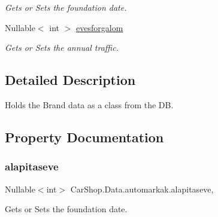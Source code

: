 \begin{DoxyCompactItemize}
\begin{DoxyCompactList}\small\item\em Gets or Sets the foundation date. \end{DoxyCompactList}\item 
Nullable$<$ int $>$ \mbox{\hyperlink{class_car_shop_1_1_data_1_1automarkak_a274c209496d4dfd5c9a542eacaa41ef4}{evesforgalom}}
\begin{DoxyCompactList}\small\item\em Gets or Sets the annual traffic. \end{DoxyCompactList}\end{DoxyCompactItemize}


\subsection{Detailed Description}
Holds the Brand data as a class from the DB. 



\subsection{Property Documentation}
\mbox{\label{class_car_shop_1_1_data_1_1automarkak_a2ace68ab067bd8ddc272037e27aae27b}} 
\subsubsection{\texorpdfstring{alapitaseve}{alapitaseve}}
{\footnotesize\ttfamily Nullable$<$int$>$ Car\+Shop.\+Data.\+automarkak.\+alapitaseve\hspace{0.3cm}{\ttfamily [get]}, {\ttfamily [set]}}



Gets or Sets the foundation date. 

\mbox{\label{class_car_shop_1_1_data_1_1automarkak_a274c209496d4dfd5c9a542eacaa41ef4}} 
